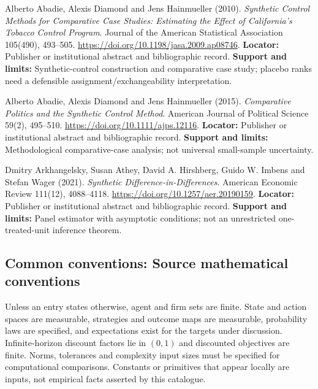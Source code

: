 \documentclass[11pt,a4paper]{article}
\begin{document}
\begin{enumerate}[label={[\textnormal{S}\arabic*]},leftmargin=*]

\item Alberto Abadie, Alexis Diamond and Jens Hainmueller (2010). \emph{Synthetic Control Methods for Comparative Case Studies: Estimating the Effect of California’s Tobacco Control Program}. Journal of the American Statistical Association 105(490), 493–505. \url{https://doi.org/10.1198/jasa.2009.ap08746}. \textbf{Locator:} Publisher or institutional abstract and bibliographic record. \textbf{Support and limits:} Synthetic-control construction and comparative case study; placebo ranks need a defensible assignment/exchangeability interpretation.

\item Alberto Abadie, Alexis Diamond and Jens Hainmueller (2015). \emph{Comparative Politics and the Synthetic Control Method}. American Journal of Political Science 59(2), 495–510. \url{https://doi.org/10.1111/ajps.12116}. \textbf{Locator:} Publisher or institutional abstract and bibliographic record. \textbf{Support and limits:} Methodological comparative-case analysis; not universal small-sample uncertainty.

\item Dmitry Arkhangelsky, Susan Athey, David A. Hirshberg, Guido W. Imbens and Stefan Wager (2021). \emph{Synthetic Difference-in-Differences}. American Economic Review 111(12), 4088–4118. \url{https://doi.org/10.1257/aer.20190159}. \textbf{Locator:} Publisher or institutional abstract and bibliographic record. \textbf{Support and limits:} Panel estimator with asymptotic conditions; not an unrestricted one-treated-unit inference theorem.

\end{enumerate}

\subsection*{Common conventions: Source mathematical conventions}

Unless an entry states otherwise, agent and firm sets are finite. State and action spaces are measurable, strategies and outcome maps are measurable, probability laws are specified, and expectations exist for the targets under discussion. Infinite-horizon discount factors lie in $(0,1)$ and discounted objectives are finite. Norms, tolerances and complexity input sizes must be specified for computational comparisons. Constants or primitives that appear locally are inputs, not empirical facts asserted by this catalogue.
\end{document}
